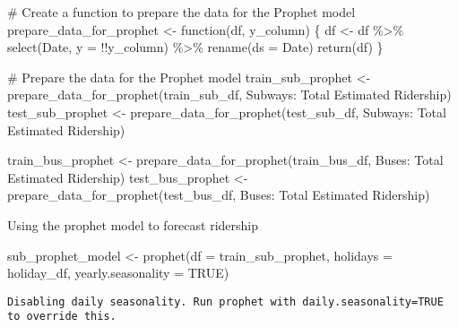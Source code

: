 \documentclass[
  letterpaper,
  DIV=11,
  numbers=noendperiod]{scrartcl}
\newenvironment{Shaded}{\begin{snugshade}}{\end{snugshade}}
\newcommand{\AttributeTok}[1]{\textcolor[rgb]{0.40,0.45,0.13}{#1}}
\newcommand{\CommentTok}[1]{\textcolor[rgb]{0.37,0.37,0.37}{#1}}
\newcommand{\ConstantTok}[1]{\textcolor[rgb]{0.56,0.35,0.01}{#1}}
\newcommand{\ControlFlowTok}[1]{\textcolor[rgb]{0.00,0.23,0.31}{#1}}
\newcommand{\FunctionTok}[1]{\textcolor[rgb]{0.28,0.35,0.67}{#1}}
\newcommand{\NormalTok}[1]{\textcolor[rgb]{0.00,0.23,0.31}{#1}}
\newcommand{\OtherTok}[1]{\textcolor[rgb]{0.00,0.23,0.31}{#1}}
\newcommand{\SpecialCharTok}[1]{\textcolor[rgb]{0.37,0.37,0.37}{#1}}
\newcommand{\StringTok}[1]{\textcolor[rgb]{0.13,0.47,0.30}{#1}}
\begin{document}
\begin{Shaded}
\begin{Highlighting}[]
\CommentTok{\# Create a function to prepare the data for the Prophet model}
\NormalTok{prepare\_data\_for\_prophet }\OtherTok{\textless{}{-}} \ControlFlowTok{function}\NormalTok{(df, y\_column) \{}
\NormalTok{  df }\OtherTok{\textless{}{-}}\NormalTok{ df }\SpecialCharTok{\%\textgreater{}\%}
    \FunctionTok{select}\NormalTok{(Date, }\AttributeTok{y =} \SpecialCharTok{!!}\NormalTok{y\_column) }\SpecialCharTok{\%\textgreater{}\%}
    \FunctionTok{rename}\NormalTok{(}\AttributeTok{ds =}\NormalTok{ Date)}
  \FunctionTok{return}\NormalTok{(df)}
\NormalTok{\}}

\CommentTok{\# Prepare the data for the Prophet model}
\NormalTok{train\_sub\_prophet }\OtherTok{\textless{}{-}} \FunctionTok{prepare\_data\_for\_prophet}\NormalTok{(train\_sub\_df, }\StringTok{\textquotesingle{}Subways: Total Estimated Ridership\textquotesingle{}}\NormalTok{)}
\NormalTok{test\_sub\_prophet }\OtherTok{\textless{}{-}} \FunctionTok{prepare\_data\_for\_prophet}\NormalTok{(test\_sub\_df, }\StringTok{\textquotesingle{}Subways: Total Estimated Ridership\textquotesingle{}}\NormalTok{)}
  
\NormalTok{train\_bus\_prophet }\OtherTok{\textless{}{-}} \FunctionTok{prepare\_data\_for\_prophet}\NormalTok{(train\_bus\_df, }\StringTok{\textquotesingle{}Buses: Total Estimated Ridership\textquotesingle{}}\NormalTok{)}
\NormalTok{test\_bus\_prophet }\OtherTok{\textless{}{-}} \FunctionTok{prepare\_data\_for\_prophet}\NormalTok{(test\_bus\_df, }\StringTok{\textquotesingle{}Buses: Total Estimated Ridership\textquotesingle{}}\NormalTok{)}
\end{Highlighting}
\end{Shaded}

Using the prophet model to forecast ridership

\begin{Shaded}
\begin{Highlighting}[]
\NormalTok{sub\_prophet\_model }\OtherTok{\textless{}{-}} \FunctionTok{prophet}\NormalTok{(}\AttributeTok{df =}\NormalTok{ train\_sub\_prophet, }\AttributeTok{holidays =}\NormalTok{ holiday\_df, }\AttributeTok{yearly.seasonality =} \ConstantTok{TRUE}\NormalTok{)}
\end{Highlighting}
\end{Shaded}

\begin{verbatim}
Disabling daily seasonality. Run prophet with daily.seasonality=TRUE to override this.
\end{verbatim}
\end{document}
